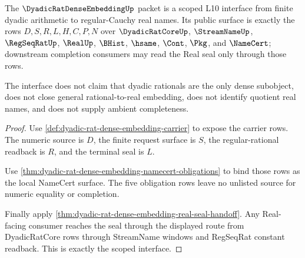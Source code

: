 \begin{theorem}
\label{thm:dyadic-rat-dense-embedding-scoped-interface}
The $\DyadicRatDenseEmbeddingUp$ packet is a scoped L10 interface from finite dyadic arithmetic to regular-Cauchy real names. Its public surface is exactly the rows $D,S,R,L,H,C,P,N$ over $\DyadicRatCoreUp$, $\StreamNameUp$, $\RegSeqRatUp$, $\RealUp$, $\BHist$, $\hsame$, $\Cont$, $\Pkg$, and $\NameCert$; downstream completion consumers may read the Real seal only through those rows.

The interface does not claim that dyadic rationals are the only dense subobject, does not close general rational-to-real embedding, does not identify quotient real names, and does not supply ambient completeness.
\end{theorem}
\begin{proof}
Use \autoref{def:dyadic-rat-dense-embedding-carrier} to expose the carrier rows. The numeric source is $D$, the finite request surface is $S$, the regular-rational readback is $R$, and the terminal seal is $L$.

Use \autoref{thm:dyadic-rat-dense-embedding-namecert-obligations} to bind those rows as the local NameCert surface. The five obligation rows leave no unlisted source for numeric equality or completion.

Finally apply \autoref{thm:dyadic-rat-dense-embedding-real-seal-handoff}. Any Real-facing consumer reaches the seal through the displayed route from DyadicRatCore rows through StreamName windows and RegSeqRat constant readback. This is exactly the scoped interface.
\end{proof}




